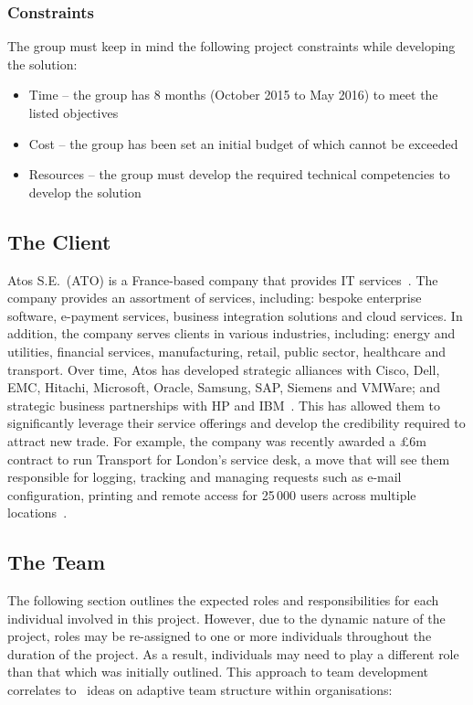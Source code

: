 \subsubsection{Constraints}

The group must keep in mind the following project constraints while developing the solution:

\begin{itemize}
	\item Time -- the group has 8 months (October 2015 to May 2016) to meet the listed objectives
	\item Cost -- the group has been set an initial budget of  which cannot be exceeded
	\item Resources -- the group must develop the required technical competencies to develop the solution
\end{itemize}

\subsection{The Client}

Atos S.E.~(ATO) is a France-based company that provides IT services~\parencite{web:reuters}. The company provides an assortment of services, including: bespoke enterprise software, e-payment services, business integration solutions and cloud services. In addition, the company serves clients in various industries, including: energy and utilities, financial services, manufacturing, retail, public sector, healthcare and transport. Over time, Atos has developed strategic alliances with Cisco, Dell, EMC, Hitachi, Microsoft, Oracle, Samsung, SAP, Siemens and VMWare; and strategic business partnerships with HP and IBM~\parencite{web:bloomberg}. This has allowed them to significantly leverage their service offerings and develop the credibility required to attract new trade. For example, the company was recently awarded a \pounds 6m contract to run Transport for London's service desk, a move that will see them responsible for logging, tracking and managing requests such as e-mail configuration, printing and remote access for 25\,000 users across multiple locations~\parencite{web:jee}.

\subsection{The Team}

The following section outlines the expected roles and responsibilities for each individual involved in this project. However, due to the dynamic nature of the project, roles may be re-assigned to one or more individuals throughout the duration of the project. As a result, individuals may need to play a different role than that which was initially outlined. This approach to team development correlates to~\textcite{book:xteams} ideas on adaptive team structure within organisations:

